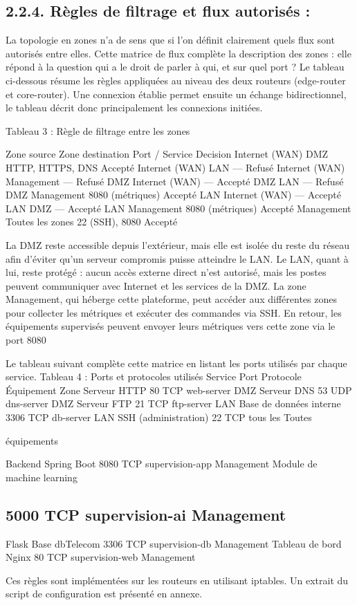 \documentclass[12pt,a4paper]{report}
\begin{document}
\subsection*{2.2.4. Règles de filtrage et flux autorisés :}
La topologie en zones n'a de sens que si l'on définit clairement quels flux sont autorisés entre elles. Cette matrice de flux complète la description des zones : elle répond à la question qui a le droit de parler à qui, et sur quel port ? Le tableau ci-dessous résume les règles appliquées au niveau des deux routeurs (edge-router et core-router). Une connexion établie permet ensuite un échange bidirectionnel, le tableau décrit donc principalement les connexions initiées.\par
Tableau 3 : Règle de filtrage entre les zones\par
Zone source Zone destination Port / Service Decision Internet (WAN) DMZ HTTP, HTTPS, DNS Accepté Internet (WAN) LAN — Refusé Internet (WAN) Management — Refusé DMZ Internet (WAN) — Accepté DMZ LAN — Refusé DMZ Management 8080 (métriques) Accepté LAN Internet (WAN) — Accepté LAN DMZ — Accepté LAN Management 8080 (métriques) Accepté Management Toutes les zones 22 (SSH), 8080 Accepté\par
La DMZ reste accessible depuis l’extérieur, mais elle est isolée du reste du réseau afin d’éviter qu’un serveur compromis puisse atteindre le LAN. Le LAN, quant à lui, reste protégé : aucun accès externe direct n’est autorisé, mais les postes peuvent communiquer avec Internet et les services de la DMZ. La zone Management, qui héberge cette plateforme, peut accéder aux différentes zones pour collecter les métriques et exécuter des commandes via SSH. En retour, les équipements supervisés peuvent envoyer leurs métriques vers cette zone via le port 8080\par
Le tableau suivant complète cette matrice en listant les ports utilisés par chaque service. Tableau 4 : Ports et protocoles utilisés Service Port Protocole Équipement Zone Serveur HTTP 80 TCP web-server DMZ Serveur DNS 53 UDP dns-server DMZ Serveur FTP 21 TCP ftp-server LAN Base de données interne 3306 TCP db-server LAN SSH (administration) 22 TCP tous les Toutes\par
équipements\par
Backend Spring Boot 8080 TCP supervision-app Management Module de machine learning\par
\subsection*{5000 TCP supervision-ai Management}
Flask Base dbTelecom 3306 TCP supervision-db Management Tableau de bord Nginx 80 TCP supervision-web Management\par
Ces règles sont implémentées sur les routeurs en utilisant iptables. Un extrait du script de configuration est présenté en annexe.\par
\end{document}
